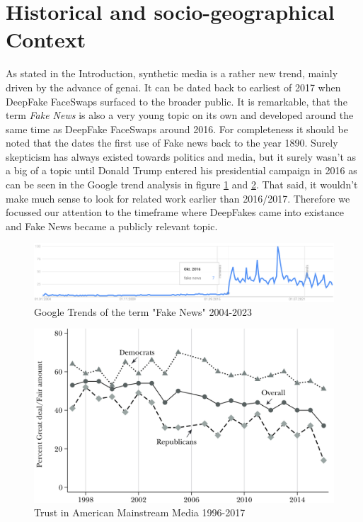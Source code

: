 \documentclass[
  a4paper,  %
  twoside,  %
  bibliography=totoc,
  headsepline,
  cleardoublepage=empty,
  parskip=half,
  draft=false
]{scrbook}
\begin{document}
\section{Historical and socio-geographical Context}
\label{sec:hist-context}
As stated in the Introduction, synthetic media is a rather new trend, mainly driven by the advance of \gls{genai}. It can be dated back to earliest of 2017 when DeepFake FaceSwaps surfaced to the broader public. It is remarkable, that the term \textit{Fake News} is also a very young topic on its own and developed around the same time as DeepFake FaceSwaps around 2016. For completeness it should be noted that the \citet{merriam-websterdictionaryRealStoryFake} dates the first use of Fake news back to the year 1890. Surely skepticism has always existed towards politics and media, but it surely wasn't as a big of a topic until Donald Trump entered his presidential campaign in 2016 as can be seen in the Google trend analysis in figure \ref{fig:gtrend-fake-news} and \ref{fig:trust-us}. That said, it wouldn't make much sense to look for related work earlier than 2016/2017. Therefore we focussed our attention to the timeframe where DeepFakes came into existance and Fake News became a publicly relevant topic.
\begin{figure}[h]
  \centering
  \includegraphics[width=1\textwidth]{./graphics/images/gtrends_fakenews_1011-2311.png}
  \caption{Google Trends of the term "Fake News" 2004-2023}
  \label{fig:gtrend-fake-news}
\end{figure}
\begin{figure}[h]
  \centering
  \centering
  \includegraphics[width=0.75\linewidth]{./graphics/images/trust-america mainstream.png}
  \caption{Trust in American Mainstream Media 1996-2017 \cite{allcottSocialMediaFake2017}}
  \label{fig:trust-us}
\end{figure}
\end{document}
